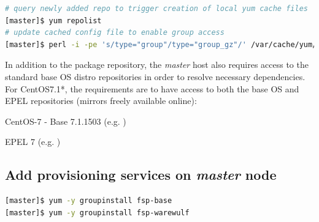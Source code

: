 \documentclass[letterpaper]{article}
\newcommand{\baseOS}{CentOS7.1*}
\begin{document}
\begin{lstlisting}[language=bash,keywords={}]
# query newly added repo to trigger creation of local yum cache files
[master]$ yum repolist          
# update cached config file to enable group access
[master]$ perl -i -pe 's/type="group"/type="group_gz"/' /var/cache/yum/x86_64/7/ForestPeak_*/repomd.xml
\end{lstlisting}

In addition to the \FSP{} package repository, the {\em master} host also
requires access to the standard base OS distro repositories in order to resolve
necessary dependencies. For \baseOS{}, the requirements are to have access to
both the base OS and EPEL repositories (mirrors freely available online):

\begin{itemize*}
\item CentOS-7 - Base 7.1.1503
  (e.g. \href{http://mirror.centos.org/centos/7.1.1503/os/x86\_64}
             {\color{blue}{http://mirror.centos.org/centos/7.1.1503/os/x86\_64}} )
\item EPEL 7 (e.g. \href{http://download.fedoraproject.org/pub/epel/7/x86\_64}
                        {\color{blue}{http://download.fedoraproject.org/pub/epel/7/x86\_64}} )
\end{itemize*}


\subsection{Add provisioning services on {\em master} node}


\begin{lstlisting}[language=bash,keywords={}]
[master]$ yum -y groupinstall fsp-base      
[master]$ yum -y groupinstall fsp-warewulf
\end{lstlisting}

\end{document}
